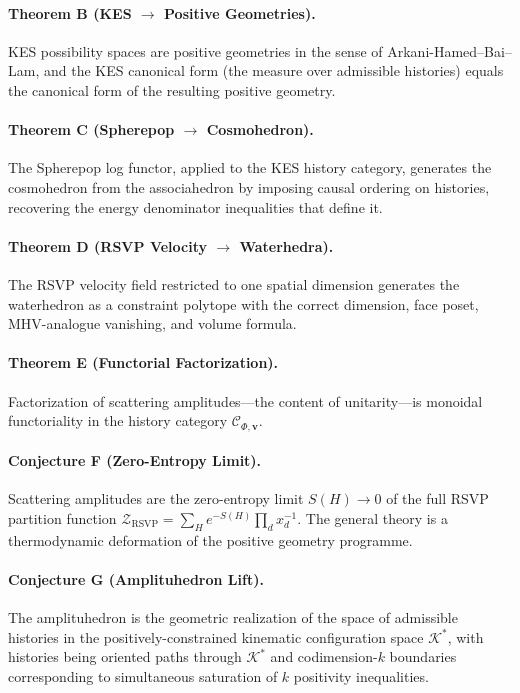 \documentclass[12pt, oneside]{amsart}
\theoremstyle{plain}
\theoremstyle{definition}
\theoremstyle{remark}
\newcommand{\Sf}{S}         %
\newcommand{\Ccat}{\mathcal{C}_{\Phi,\mathbf{v}}}
\newcommand{\ZRSVP}{\mathcal{Z}_{\mathrm{RSVP}}}
\begin{document}
\paragraph{Theorem B (KES $\to$ Positive Geometries).} KES possibility spaces are positive geometries in the sense of Arkani-Hamed--Bai--Lam, and the KES canonical form (the measure over admissible histories) equals the canonical form of the resulting positive geometry.

\paragraph{Theorem C (Spherepop $\to$ Cosmohedron).} The Spherepop log functor, applied to the KES history category, generates the cosmohedron from the associahedron by imposing causal ordering on histories, recovering the energy denominator inequalities that define it.

\paragraph{Theorem D (RSVP Velocity $\to$ Waterhedra).} The RSVP velocity field restricted to one spatial dimension generates the waterhedron as a constraint polytope with the correct dimension, face poset, MHV-analogue vanishing, and volume formula.

\paragraph{Theorem E (Functorial Factorization).} Factorization of scattering amplitudes---the content of unitarity---is monoidal functoriality in the history category $\Ccat$.

\paragraph{Conjecture F (Zero-Entropy Limit).} Scattering amplitudes are the zero-entropy limit $\Sf(H) \to 0$ of the full RSVP partition function $\ZRSVP = \sum_H e^{-\Sf(H)} \prod_d x_d^{-1}$. The general theory is a thermodynamic deformation of the positive geometry programme.

\paragraph{Conjecture G (Amplituhedron Lift).} The amplituhedron is the geometric realization of the space of admissible histories in the positively-constrained kinematic configuration space $\mathcal{K}^*$, with histories being oriented paths through $\mathcal{K}^*$ and codimension-$k$ boundaries corresponding to simultaneous saturation of $k$ positivity inequalities.
\end{document}
